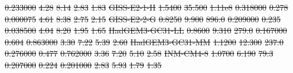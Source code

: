 \documentclass[gmd, manuscript]{copernicus}
\providecommand{\DIFdel}[1]{{\protect\color{red}\sout{#1}}}                      %
\providecommand{\DIFdelFL}[1]{\DIFdel{#1}} %
\begin{document}
\begin{table}[t]
{\DIFdelFL{0.233000 }%
\DIFdelFL{4.28 }%
\DIFdelFL{8.14 }%
\DIFdelFL{2.83 }%
\DIFdelFL{1.83 }%
\DIFdelFL{GISS-E2-1-H     }%
\DIFdelFL{1.5400 }%
\DIFdelFL{35.500 }%
\DIFdelFL{1.11e8 }%
\DIFdelFL{0.318000 }%
\DIFdelFL{0.278 }%
\DIFdelFL{0.000075 }%
\DIFdelFL{4.61 }%
\DIFdelFL{8.38 }%
\DIFdelFL{2.75 }%
\DIFdelFL{2.15 }%
\DIFdelFL{GISS-E2-2-G     }%
\DIFdelFL{0.8250 }%
\DIFdelFL{9.900 }%
\DIFdelFL{896.0 }%
\DIFdelFL{0.209000 }%
\DIFdelFL{0.235 }%
\DIFdelFL{0.038500 }%
\DIFdelFL{4.04 }%
\DIFdelFL{8.20 }%
\DIFdelFL{1.95 }%
\DIFdelFL{1.65 }%
\DIFdelFL{HadGEM3-GC31-LL }%
\DIFdelFL{0.8600 }%
\DIFdelFL{9.310 }%
\DIFdelFL{279.0 }%
\DIFdelFL{0.167000 }%
\DIFdelFL{0.604 }%
\DIFdelFL{0.863000 }%
\DIFdelFL{3.30 }%
\DIFdelFL{7.22 }%
\DIFdelFL{5.39 }%
\DIFdelFL{2.60 }%
\DIFdelFL{HadGEM3-GC31-MM }%
\DIFdelFL{1.1200 }%
\DIFdelFL{12.300 }%
\DIFdelFL{237.0 }%
\DIFdelFL{0.276000 }%
\DIFdelFL{0.477 }%
\DIFdelFL{0.762000 }%
\DIFdelFL{3.36 }%
\DIFdelFL{7.20 }%
\DIFdelFL{5.10 }%
\DIFdelFL{2.58 }%
\DIFdelFL{INM-CM4-8       }%
\DIFdelFL{1.0700 }%
\DIFdelFL{6.190 }%
\DIFdelFL{79.3 }%
\DIFdelFL{0.207000 }%
\DIFdelFL{0.224 }%
\DIFdelFL{0.201000 }%
\DIFdelFL{2.83 }%
\DIFdelFL{5.93 }%
\DIFdelFL{1.79 }%
\DIFdelFL{1.35 }%
}
\end{table}
\end{document}

